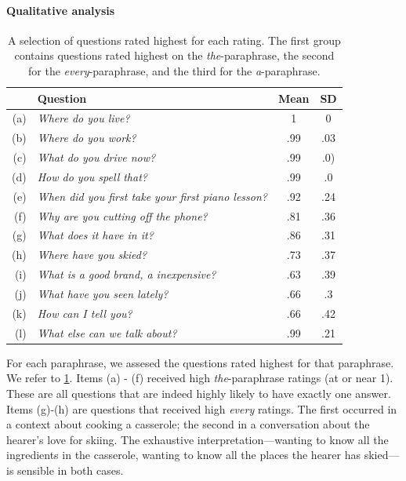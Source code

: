 \documentclass[12pt,letterpaper,table,svgnames,dvipsnames]{article}
\newcommand{\jd}[1]{\textcolor{Purple}{[jd: #1]}}
\begin{document}


\paragraph{Qualitative analysis}

\begin{table}[h!]
    \centering
    \begin{tabular}{|rl|c|c|}
        \hline
        {} & \textbf{Question} & \textbf{Mean} & \textbf{SD} \\
        \hline
        \hline
        (a) & \emph{Where do you live?}       & 1   & 0\\
        (b) & \emph{Where do you work?}       &.99  & .03 \\
        (c) & \emph{What do you drive now?}   &.99    & .0) \\
        (d) & \emph{How do you spell that?}   &.99 &.0\\
        (e) & \emph{When did you first take your first piano lesson?} &.92 & .24 \\
        (f) & \emph{Why are you cutting off the phone?} & .81 & .36\\
        \midrule
        (g) & \emph{What does it have in it?} & .86 & .31 \\
        (h) & \emph{Where have you skied?} &.73 & .37 \\
        \midrule
        (i) & \emph{What is a good brand, a inexpensive?} & .63 & .39\\
        (j) & \emph{What have you seen lately?} & .66 & .3\\
        (k) & \emph{How can I tell you?} & .66 & .42 \\
        (l) & \emph{What else can we talk about?} & .99 & .21\\
        \hline
    \end{tabular}
    \caption{A selection of questions rated highest for each rating. The first group contains questions rated highest on the \emph{the}-paraphrase, the second for the \emph{every}-paraphrase, and the third for the \emph{a}-paraphrase.}
    \label{tab:e1-qualitative}
\end{table}
For each paraphrase, we assesed the questions rated highest for that paraphrase. We refer to \ref{tab:e1-qualitative}. Items (a) - (f) received high \emph{the}-paraphrase ratings (at or near 1). These are all questions that are indeed highly likely to have exactly one answer. 
Items (g)-(h) are questions that received high \emph{every} ratings. The first occurred in a context about cooking a casserole; the second in a conversation about the hearer's love for skiing. The exhaustive interpretation---wanting to know all the ingredients in the casserole, wanting to know all the places the hearer has skied---is sensible in both cases.
\end{document}
